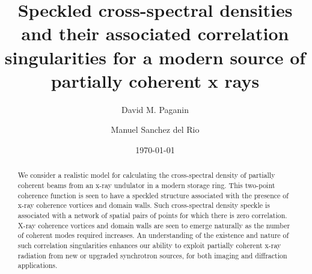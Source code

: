 \documentclass[%
 reprint,
 amsmath,amssymb,
 aps,
]{revtex4-1}
\begin{document}

\title{Speckled cross-spectral densities and their associated correlation singularities for a modern source of partially coherent x rays}


\author{David M. Paganin}

\author{Manuel Sanchez del Rio}

\date{\today}

\begin{abstract}
We consider a realistic model for calculating the cross-spectral density of partially coherent beams from an x-ray undulator in a modern storage ring.  This two-point coherence function is seen to have a speckled structure associated with the presence of x-ray coherence vortices and domain walls.  Such cross-spectral density speckle is associated with a network of spatial pairs of points for which there is zero correlation.  X-ray coherence vortices and domain walls are seen to emerge naturally as the number of coherent modes required increases.  An understanding of the existence and nature of such correlation singularities enhances our ability to exploit partially coherent x-ray radiation from new or upgraded synchrotron sources, for both imaging and diffraction applications.
\end{abstract}

\maketitle                        %

\end{document}
